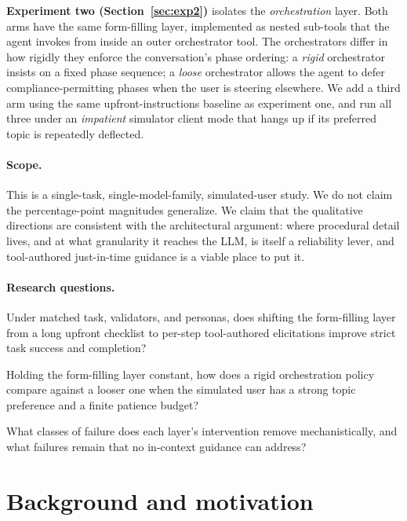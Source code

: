 \documentclass[11pt,a4paper]{article}
\begin{document}
\textbf{Experiment two (Section~\ref{sec:exp2})} isolates the \emph{orchestration} layer. Both arms have the same form-filling layer, implemented as nested sub-tools that the agent invokes from inside an outer orchestrator tool. The orchestrators differ in how rigidly they enforce the conversation's phase ordering: a \emph{rigid} orchestrator insists on a fixed phase sequence; a \emph{loose} orchestrator allows the agent to defer compliance-permitting phases when the user is steering elsewhere. We add a third arm using the same upfront-instructions baseline as experiment one, and run all three under an \emph{impatient} simulator client mode that hangs up if its preferred topic is repeatedly deflected.

\paragraph{Scope.} This is a single-task, single-model-family, simulated-user study. We do not claim the percentage-point magnitudes generalize. We claim that the qualitative directions are consistent with the architectural argument: where procedural detail lives, and at what granularity it reaches the LLM, is itself a reliability lever, and tool-authored just-in-time guidance is a viable place to put it.

\paragraph{Research questions.}
\begin{description}[noitemsep,leftmargin=2em,style=nextline]
    \item[RQ1 (form-filling)] Under matched task, validators, and personas, does shifting the form-filling layer from a long upfront checklist to per-step tool-authored elicitations improve strict task success and completion?
    \item[RQ2 (orchestration)] Holding the form-filling layer constant, how does a rigid orchestration policy compare against a looser one when the simulated user has a strong topic preference and a finite patience budget?
    \item[RQ3 (mechanism)] What classes of failure does each layer's intervention remove mechanistically, and what failures remain that no in-context guidance can address?
\end{description}

\section{Background and motivation}
\label{sec:background}
\end{document}
